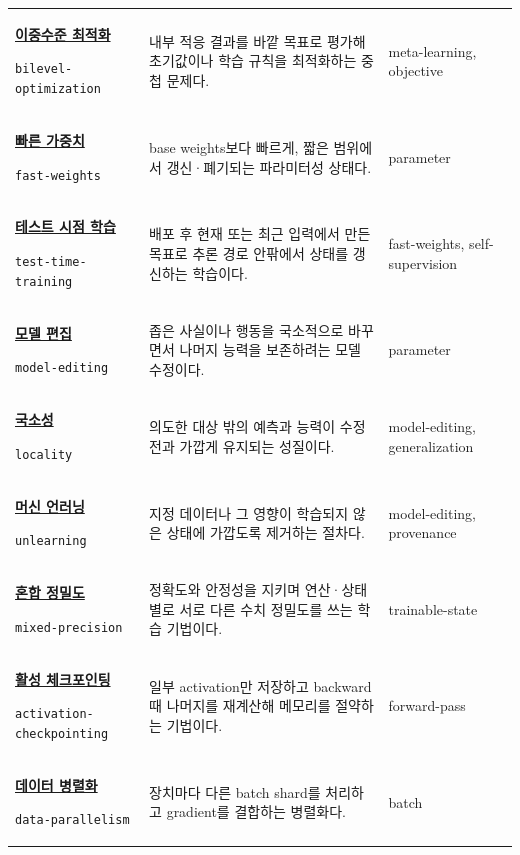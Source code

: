 \begin{longtable}{p{} p{} p{}}
\hypertarget{glossary:bilevel-optimization}{\hyperref[bg:bilevel-optimization]{\textbf{이중수준 최적화}}} \newline\texttt{bilevel-optimization} & 내부 적응 결과를 바깥 목표로 평가해 초기값이나 학습 규칙을 최적화하는 중첩 문제다. & \scriptsize meta-learning, objective \\
\hypertarget{glossary:fast-weights}{\hyperref[bg:fast-weights]{\textbf{빠른 가중치}}} \newline\texttt{fast-weights} & base weights보다 빠르게, 짧은 범위에서 갱신·폐기되는 파라미터성 상태다. & \scriptsize parameter \\
\hypertarget{glossary:test-time-training}{\hyperref[bg:test-time-training]{\textbf{테스트 시점 학습}}} \newline\texttt{test-time-training} & 배포 후 현재 또는 최근 입력에서 만든 목표로 추론 경로 안팎에서 상태를 갱신하는 학습이다. & \scriptsize fast-weights, self-supervision \\
\hypertarget{glossary:model-editing}{\hyperref[bg:model-editing]{\textbf{모델 편집}}} \newline\texttt{model-editing} & 좁은 사실이나 행동을 국소적으로 바꾸면서 나머지 능력을 보존하려는 모델 수정이다. & \scriptsize parameter \\
\hypertarget{glossary:locality}{\hyperref[bg:locality]{\textbf{국소성}}} \newline\texttt{locality} & 의도한 대상 밖의 예측과 능력이 수정 전과 가깝게 유지되는 성질이다. & \scriptsize model-editing, generalization \\
\hypertarget{glossary:unlearning}{\hyperref[bg:unlearning]{\textbf{머신 언러닝}}} \newline\texttt{unlearning} & 지정 데이터나 그 영향이 학습되지 않은 상태에 가깝도록 제거하는 절차다. & \scriptsize model-editing, provenance \\
\hypertarget{glossary:mixed-precision}{\hyperref[bg:mixed-precision]{\textbf{혼합 정밀도}}} \newline\texttt{mixed-precision} & 정확도와 안정성을 지키며 연산·상태별로 서로 다른 수치 정밀도를 쓰는 학습 기법이다. & \scriptsize trainable-state \\
\hypertarget{glossary:activation-checkpointing}{\hyperref[bg:activation-checkpointing]{\textbf{활성 체크포인팅}}} \newline\texttt{activation-checkpointing} & 일부 activation만 저장하고 backward 때 나머지를 재계산해 메모리를 절약하는 기법이다. & \scriptsize forward-pass \\
\hypertarget{glossary:data-parallelism}{\hyperref[bg:data-parallelism]{\textbf{데이터 병렬화}}} \newline\texttt{data-parallelism} & 장치마다 다른 batch shard를 처리하고 gradient를 결합하는 병렬화다. & \scriptsize batch \\

\end{longtable}
